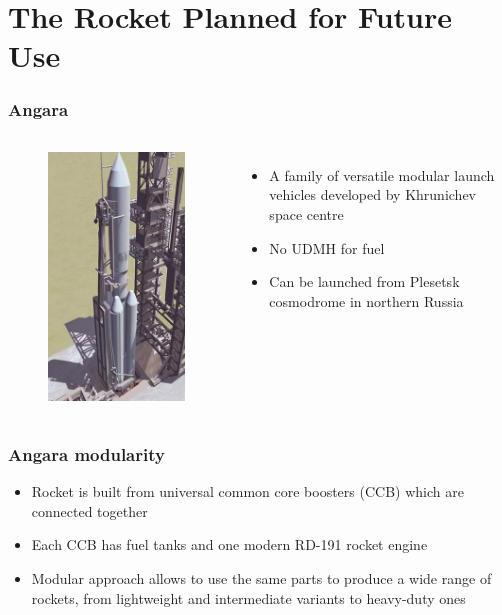 \documentclass[onlymath]{beamer}
\newcommand\tw\textwidth
\begin{document}
\section{The Rocket Planned for Future Use}
\begin{frame}
  \frametitle{Angara}
  \begin{columns}
    \column{.35\tw}
    \begin{figure}
      \centering
      \includegraphics[scale=0.3]{Angara_Render.jpg}
    \end{figure}
    \column{.65\tw}
    \begin{itemize}
    \item A family of versatile modular launch vehicles developed by
      Khrunichev space centre
    \item No UDMH for fuel
    \item Can be launched from Plesetsk cosmodrome in northern Russia
    \end{itemize}
  \end{columns}
\end{frame}

\begin{frame}
  \frametitle{Angara modularity}
  \begin{itemize}
  \item Rocket is built from universal common core boosters (CCB)
    which are connected together
  \item Each CCB has fuel tanks and one modern RD-191 rocket engine
  \item Modular approach allows to use the same parts to produce a
    wide range of rockets, from lightweight and intermediate variants
    to heavy-duty ones
  \end{itemize}
\end{frame}
\end{document}
